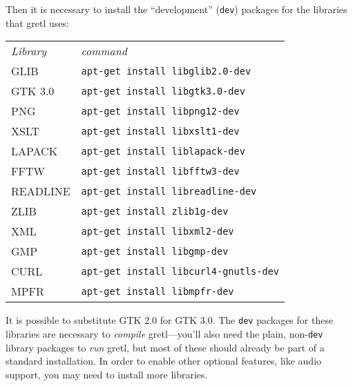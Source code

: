 Then it is necessary to install the ``development'' (\texttt{dev})
packages for the libraries that gretl uses: 
\begin{center}
  \begin{tabular}{ll}
    \textit{Library} & \textit{command} \\ [4pt]
    GLIB     & \texttt{apt-get install libglib2.0-dev} \\
    GTK 3.0  & \texttt{apt-get install libgtk3.0-dev} \\
    PNG      & \texttt{apt-get install libpng12-dev} \\
    XSLT     & \texttt{apt-get install libxslt1-dev} \\
    LAPACK   & \texttt{apt-get install liblapack-dev} \\
    FFTW     & \texttt{apt-get install libfftw3-dev} \\
    READLINE & \texttt{apt-get install libreadline-dev} \\
    ZLIB     & \texttt{apt-get install zlib1g-dev} \\
    XML      & \texttt{apt-get install libxml2-dev} \\
    GMP      & \texttt{apt-get install libgmp-dev} \\
    CURL     & \texttt{apt-get install libcurl4-gnutls-dev} \\
    MPFR     & \texttt{apt-get install libmpfr-dev}
  \end{tabular}
\end{center}

It is possible to substitute GTK 2.0 for GTK 3.0.  The \texttt{dev}
packages for these libraries are necessary to \emph{compile}
gretl---you'll also need the plain, non-\texttt{dev} library packages
to \emph{run} gretl, but most of these should already be part of a
standard installation.  In order to enable other optional features,
like audio support, you may need to install more libraries.


